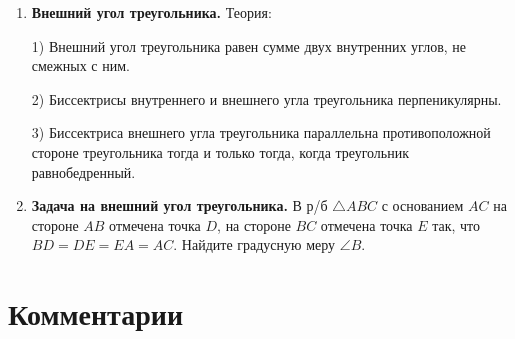 \begin{enumerate}
    \item \textbf{Внешний угол треугольника.} Теория:

    1) Внешний угол треугольника равен сумме двух внутренних углов, не смежных с ним. 

    2) Биссектрисы внутреннего и внешнего угла треугольника перпеникулярны.

    3) Биссектриса внешнего угла треугольника параллельна противоположной стороне треугольника тогда и только тогда, когда треугольник равнобедренный.

    \item \textbf{Задача на внешний угол треугольника.} В р/б $\triangle{ABC}$ с основанием $AC$ на стороне $AB$ отмечена точка $D$, на стороне $BC$ отмечена точка $E$ так, что $BD=DE=EA=AC$. Найдите градусную меру $\angle{B}$.
\end{enumerate}

\newpage

\section{Комментарии}

